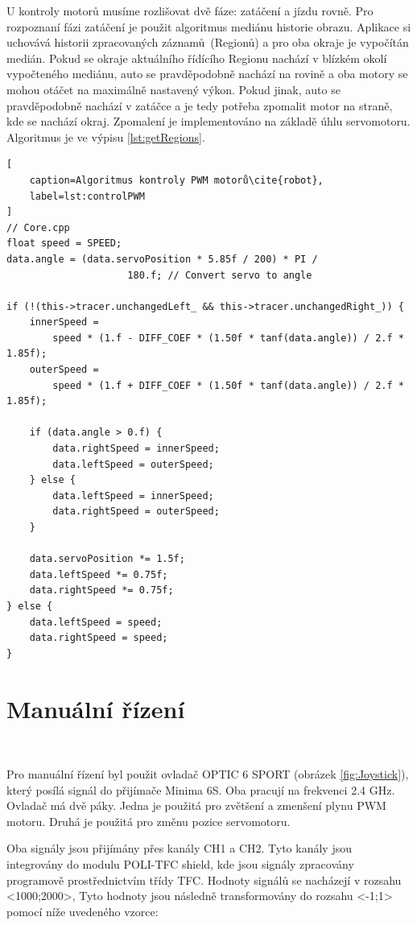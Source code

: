 U kontroly motorů musíme rozlišovat dvě fáze: zatáčení a jízdu rovně.
Pro rozpoznaní fázi zatáčení je použit algoritmus mediánu historie obrazu. Aplikace si uchovává historii zpracovaných záznamů~(Regionů) a pro oba okraje je vypočítán medián. Pokud se okraje aktuálního řídícího Regionu nachází
v blízkém okolí vypočteného mediánu, auto se pravděpodobně
nachází na rovině a oba motory se mohou otáčet na maximálně nastavený výkon.
Pokud jinak, auto se pravděpodobně nachází v zatáčce a je tedy potřeba zpomalit motor na straně, kde se nachází okraj.
Zpomalení je implementováno na základě úhlu servomotoru.
Algoritmus je ve výpisu \ref{lst:getRegions}\cite{robot}.
\begin{lstlisting}[
	caption=Algoritmus kontroly PWM motorů\cite{robot},
	label=lst:controlPWM
]
// Core.cpp
float speed = SPEED;
data.angle = (data.servoPosition * 5.85f / 200) * PI /
	                 180.f; // Convert servo to angle

if (!(this->tracer.unchangedLeft_ && this->tracer.unchangedRight_)) {
    innerSpeed =
        speed * (1.f - DIFF_COEF * (1.50f * tanf(data.angle)) / 2.f * 1.85f);
    outerSpeed =
        speed * (1.f + DIFF_COEF * (1.50f * tanf(data.angle)) / 2.f * 1.85f);

    if (data.angle > 0.f) {
        data.rightSpeed = innerSpeed;
        data.leftSpeed = outerSpeed;
    } else {
        data.leftSpeed = innerSpeed;
        data.rightSpeed = outerSpeed;
    }

    data.servoPosition *= 1.5f;
    data.leftSpeed *= 0.75f;
    data.rightSpeed *= 0.75f;
} else {
    data.leftSpeed = speed;
    data.rightSpeed = speed;
}
\end{lstlisting}

\section{Manuální řízení}\

Pro manuální řízení byl použit ovladač OPTIC 6 SPORT (obrázek \ref{fig:Joystick}),
který posílá signál do přijímače Minima 6S.
Oba pracují na frekvenci 2.4 GHz. Ovladač má
dvě páky. Jedna je použitá pro zvětšení a zmenšení plynu PWM motoru.
Druhá je použitá pro změnu pozice servomotoru\cite{RC}.

Oba signály jsou přijímány přes kanály CH1 a CH2\cite{RC}.
Tyto kanály jsou integrovány do modulu POLI-TFC shield,
kde jsou signály zpracovány programově prostřednictvím třídy TFC\cite{draha}.
Hodnoty signálů se nacházejí v rozsahu <1000;2000>, Tyto hodnoty jsou následně transformovány do rozsahu <-1;1> pomocí níže uvedeného vzorce:

